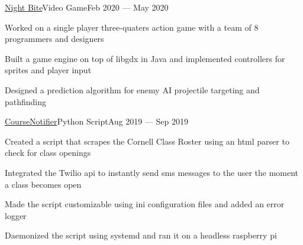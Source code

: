 \documentclass{resume}
\begin{document}
\begin{projects}
    \begin{entry}{\href{https://github.com/oliver-leung/night-bite}{Night Bite}}{Video Game}{Feb 2020 --- May 2020}
        \begin{description}
            \item Worked on a single player three-quaters action game with a
                team of 8 programmers and designers
            \item Built a game engine on top of libgdx in Java and implemented
                controllers for sprites and player input
            \item Designed a prediction algorithm for enemy AI projectile
                targeting and pathfinding
        \end{description}
    \end{entry}


    \begin{entry}{\href{https://github.com/attilusleung/CourseNotifier}{CourseNotifier}}{Python Script}{Aug 2019 --- Sep 2019}
        \begin{description}
            \item Created a script that scrapes the Cornell Class Roster
                using an html parser to check for class openings
            \item Integrated the Twilio api to instantly send sms messages to
                the user the moment a class becomes open
            \item Made the script customizable using ini configuration files and
                added an error logger
            \item Daemonized the script using systemd and ran it on a headless
                raspberry pi
        \end{description}
    \end{entry}

\end{projects}
\end{document}
